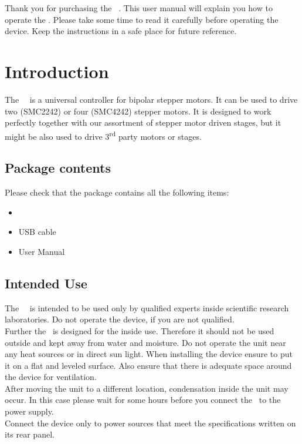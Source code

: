 Thank you for purchasing the \productNumber ~\productName. 
This user manual will explain you how to operate the \productName. 
Please take some time to read it carefully before operating the device. 
Keep the instructions in a safe place for future reference.\\

\section{Introduction}
The \productNumber ~\productName ~is a universal controller for  bipolar stepper motors. It can be used to drive two (SMC2242) or four (SMC4242) stepper motors.
It is designed to work perfectly together with  our assortment of stepper motor driven stages, but it might be also used to drive 3\textsuperscript{rd} party motors or stages.

\subsection{Package contents}
Please check that the package contains all the following items:
\begin{itemize}
\item \productNumber ~\productName
\item USB cable
\item User Manual
\end{itemize}

\subsection{Intended Use}
The \productNumber ~\productName ~is intended to be used only by qualified experts inside scientific research laboratories. Do not operate the device, if you are not qualified.\\
Further the \productName ~is designed for the inside use. Therefore it should not be used outside and kept away from water and moisture. Do not operate the unit near any heat sources or in direct sun light. When installing the device ensure to put it on a flat and leveled surface. Also ensure that there is adequate space around the device for ventilation.\\
After moving the unit to a different location, condensation inside the unit may occur. In this case please wait for some hours before you connect the \productName ~to the power supply.\\
Connect the device only to power sources that meet the specifications written on its rear panel.

